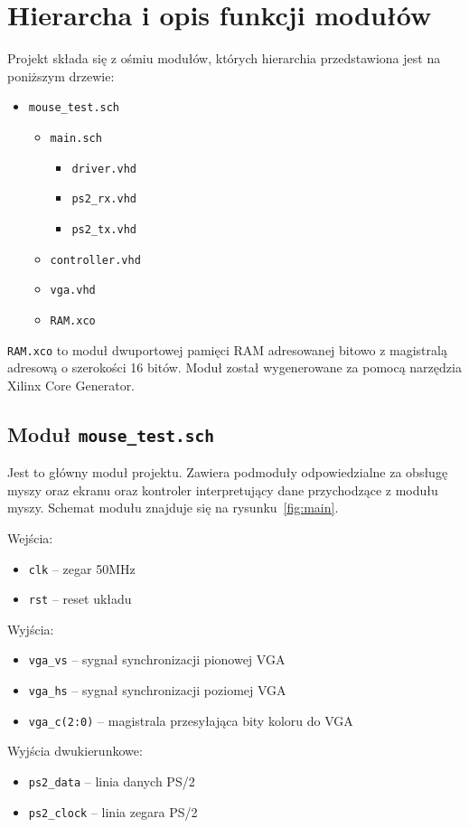 \section{Hierarcha i opis funkcji modułów}
\label{sec:hierarchia}

Projekt składa się z ośmiu modułów, których hierarchia przedstawiona jest na
poniższym drzewie:
\begin{itemize}
  \item \texttt{mouse\_test.sch}
    \begin{itemize}
      \item \texttt{main.sch}
        \begin{itemize}
          \item \texttt{driver.vhd}
          \item \texttt{ps2\_rx.vhd}
          \item \texttt{ps2\_tx.vhd}
        \end{itemize}
      \item \texttt{controller.vhd}
      \item \texttt{vga.vhd}
      \item \texttt{RAM.xco}
    \end{itemize}
\end{itemize}
\vspace{1em}

\texttt{RAM.xco} to moduł dwuportowej pamięci RAM adresowanej bitowo z
magistralą adresową o szerokości 16 bitów. Moduł został wygenerowane za pomocą
narzędzia Xilinx Core Generator.

\subsection{Moduł \texttt{mouse\_test.sch}}
Jest to główny moduł projektu. Zawiera podmoduły odpowiedzialne za obsługę myszy
oraz ekranu oraz kontroler interpretujący dane przychodzące z modułu myszy.
Schemat modułu znajduje się na rysunku~\ref{fig:main}.
\vspace{1em}

Wejścia:
\begin{itemize}
  \item \texttt{clk} -- zegar 50MHz
  \item \texttt{rst} -- reset układu
\end{itemize}
\vspace{1em}
Wyjścia:
\begin{itemize}
  \item \texttt{vga\_vs} -- sygnał synchronizacji pionowej VGA
  \item \texttt{vga\_hs} -- sygnał synchronizacji poziomej VGA
  \item \texttt{vga\_c(2:0)} -- magistrala przesyłająca bity koloru do VGA
\end{itemize}
\vspace{1em}
Wyjścia dwukierunkowe:
\begin{itemize}
  \item \texttt{ps2\_data} -- linia danych PS/2
  \item \texttt{ps2\_clock} -- linia zegara PS/2
\end{itemize}

